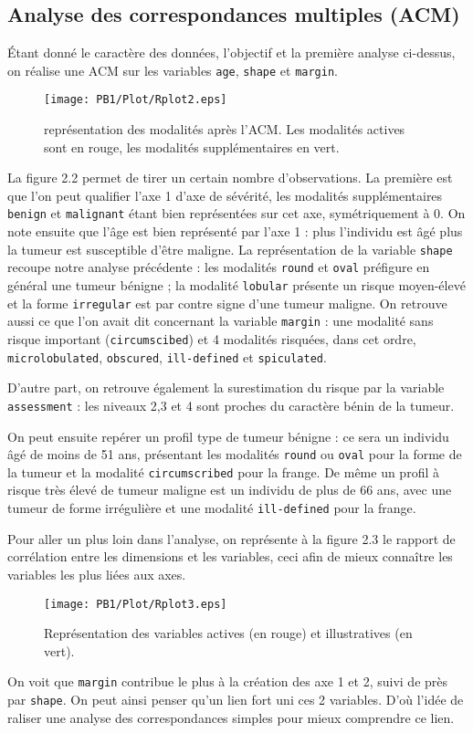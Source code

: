 \documentclass[a4paper]{report}
\begin{document}
  \subsection{Analyse des correspondances multiples (ACM)}
  Étant donné le caractère des données, l'objectif et la première analyse ci-dessus, on réalise une ACM sur les variables \verb|age|, \verb|shape| et \verb|margin|. 
  
  \begin{figure}[!ht]
	\centering
     	\texttt{[image: PB1/Plot/Rplot2.eps]}

	\caption{représentation des modalités après l'ACM. Les modalités actives sont en rouge, les modalités supplémentaires en vert.}
\end{figure}
   
La figure 2.2 permet de tirer un certain nombre d'observations. La première est que l'on peut qualifier l'axe 1 d'axe de sévérité, les modalités supplémentaires \verb|benign| et \verb|malignant| étant bien représentées sur cet axe, symétriquement à 0. On note ensuite que l'âge est bien représenté par l'axe 1 : plus l'individu est âgé plus la tumeur est susceptible d'être maligne. La représentation de la variable \verb|shape| recoupe notre analyse précédente : les modalités \verb|round| et \verb|oval| préfigure en général une tumeur bénigne ; la modalité \verb|lobular| présente un risque moyen-élevé et la forme \verb|irregular| est par contre signe d'une tumeur maligne. On retrouve aussi ce que l'on avait dit concernant la variable \verb|margin| : une modalité sans risque important (\verb|circumscibed|) et 4 modalités risquées, dans cet ordre, \verb|microlobulated|, \verb|obscured|, \verb|ill-defined| et \verb|spiculated|.

D'autre part, on retrouve également la surestimation du risque par la variable \verb|assessment| : les niveaux 2,3 et 4 sont proches du caractère bénin de la tumeur.

On peut ensuite repérer un profil type de tumeur bénigne : ce sera un individu âgé de moins de 51 ans, présentant les modalités \verb|round| ou \verb|oval| pour la forme de la tumeur et la modalité \verb|circumscribed| pour la frange.
De même un profil à risque très élevé de tumeur maligne est un individu de plus de 66 ans, avec une tumeur de forme irrégulière et une modalité \verb|ill-defined| pour la frange.
 
 Pour aller un plus loin dans l'analyse, on représente à la figure 2.3 le rapport de corrélation entre les dimensions et les variables, ceci afin de mieux connaître les variables les plus liées aux axes.
 \begin{figure}[!ht]
	\centering
     	\texttt{[image: PB1/Plot/Rplot3.eps]}

	\caption{Représentation des variables actives (en rouge) et illustratives (en vert).}
\end{figure}
On voit que \verb|margin| contribue le plus à la création des axe 1 et 2, suivi de près par \verb|shape|. On peut ainsi penser qu'un lien fort uni ces 2 variables. D'où l'idée de raliser une analyse des correspondances simples pour mieux comprendre ce lien.
\end{document}
